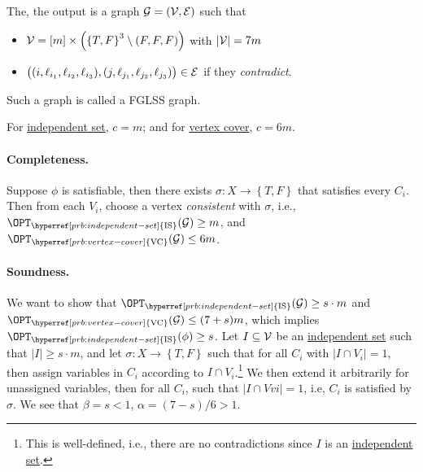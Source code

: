 The, the output is a graph \(\mathcal{\MakeUppercase{g}} =(\mathcal{\MakeUppercase{v}} , \mathcal{\MakeUppercase{e}} )\) such that
\begin{itemize}
	\item \(\mathcal{\MakeUppercase{v}} = [m]\times \left( \left\{ T, F \right\} ^3 \setminus (F, F, F) \right)\) with \(\vert \mathcal{\MakeUppercase{v}}  \vert = 7m\)
	\item \(\big((i, \ell _{i_1}, \ell _{i_2}, \ell _{i_3}), (j, \ell _{j_1}, \ell _{j_2}, \ell _{j_3})\big)\in \mathcal{\MakeUppercase{e}} \) if they \emph{contradict}.
\end{itemize}

\begin{note}
	Such a graph is called a FGLSS graph.
\end{note}

For \hyperref[prb:independent-set]{independent set}, \(c = m\); and for \hyperref[prb:vertex-cover]{vertex cover}, \(c = 6m\).

\paragraph*{Completeness.}
Suppose \(\phi \) is satisfiable, then there exists \(\sigma \colon X \to \left\{ T, F \right\} \) that satisfies every \(C_i\). Then from each \(V_i\), choose a vertex \emph{consistent} with \(\sigma \), i.e., \(\OPT_{\hyperref[prb:independent-set]{\text{IS}} }(\mathcal{\MakeUppercase{g}} ) \geq m\), and \(\OPT_{\hyperref[prb:vertex-cover]{\text{VC}} }(\mathcal{\MakeUppercase{g}} ) \leq 6m\).

\paragraph*{Soundness.}
We want to show that \(\OPT_{\hyperref[prb:independent-set]{\text{IS}} }(\mathcal{\MakeUppercase{g}} ) \geq s\cdot m\) and \(\OPT_{\hyperref[prb:vertex-cover]{\text{VC}} }(\mathcal{\MakeUppercase{g}} ) \leq (7+s)m\), which implies \(\OPT_{\hyperref[prb:independent-set]{\text{IS}} }(\phi) \geq s\). Let \(I \subseteq \mathcal{\MakeUppercase{v}} \) be an \hyperref[def:independent-set]{independent set} such that \(\vert I \vert \geq s\cdot m\), and let \(\sigma \colon X \to \left\{ T, F \right\} \) such that for all \(C_i\) with \(\vert I \cap V_i \vert = 1\), then assign variables in \(C_i\) according to \(I \cap V_i\).\footnote{This is well-defined, i.e., there are no contradictions since \(I\) is an \hyperref[def:independent-set]{independent set}.} We then extend it arbitrarily for unassigned variables, then for all \(C_i\), such that \(\vert I \cap  Vvi \vert = 1\), i.e, \(C_i\) is satisfied by \(\sigma \). We see that \(\beta = s < 1\), \(\alpha = (7-s) / 6 > 1\).

